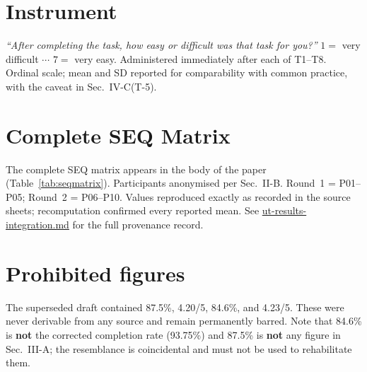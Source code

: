 \documentclass[conference]{IEEEtran}
\begin{document}
\appendix

\section{Instrument}

\emph{``After completing the task, how easy or difficult was that task for
you?''} $1 = $ very difficult $\cdots$ $7 = $ very easy. Administered immediately
after each of T1--T8. Ordinal scale; mean and SD reported for comparability
with common practice, with the caveat in Sec.~IV-C(T-5).

\section{Complete SEQ Matrix}

The complete SEQ matrix appears in the body of the paper
(Table~\ref{tab:seqmatrix}). Participants anonymised per Sec.~II-B.
Round~1 = P01--P05; Round~2 = P06--P10. Values reproduced exactly as
recorded in the source sheets; recomputation confirmed every reported
mean. See \url{ut-results-integration.md} for the full provenance
record.

\section*{Prohibited figures}

The superseded draft contained 87.5\%, 4.20/5, 84.6\%, and 4.23/5. These were
never derivable from any source and remain permanently barred. Note that
84.6\% is \textbf{not} the corrected completion rate (93.75\%) and 87.5\% is
\textbf{not} any figure in Sec.~III-A; the resemblance is coincidental and must
not be used to rehabilitate them.
\end{document}
